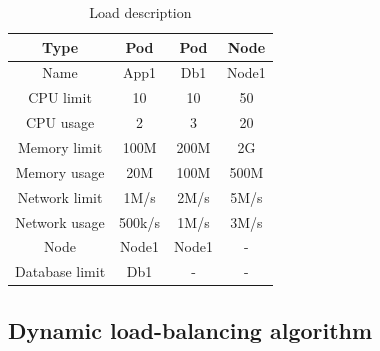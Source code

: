 \hspace{0pt}
\begin{table}[htbp]
 \begin{center}
  \begin{tabular}{c|c|c|c}
   \hline
   Type           & Pod    & Pod   & Node  \\  \hline
   Name           & App1   & Db1   & Node1 \\ \hline
   CPU limit      & 10     & 10    & 50    \\ \hline
   CPU usage      & 2      & 3     & 20    \\ \hline
   Memory limit   & 100M   & 200M  & 2G    \\ \hline
   Memory usage   & 20M    & 100M  & 500M  \\ \hline
   Network limit  & 1M/s   & 2M/s  & 5M/s  \\ \hline
   Network usage  & 500k/s & 1M/s  & 3M/s  \\ \hline
   Node           & Node1  & Node1 & -     \\ \hline
   Database limit & Db1    & -     & -     \\ \hline
  \end{tabular}
 \end{center}
 \caption{Load description}
 \label{table:load_description}
\end{table}



\subsection{Dynamic load-balancing algorithm}
\label{subsec:algorithm}

